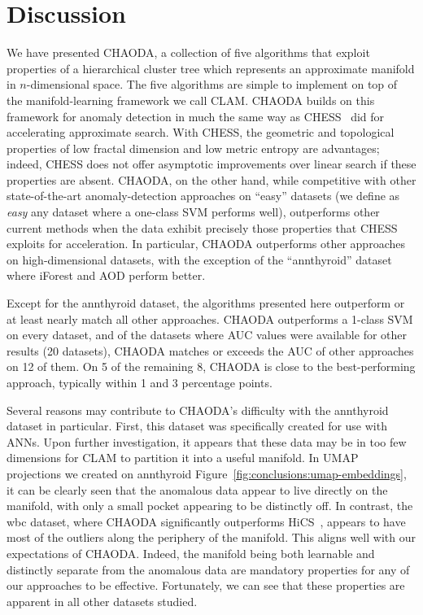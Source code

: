 \section{Discussion}
\label{sec:conclusions}

We have presented CHAODA, a collection of five algorithms that exploit properties of a hierarchical cluster tree which represents an approximate manifold in $n$-dimensional space.
The five algorithms are simple to implement on top of the manifold-learning framework we call CLAM\@.
CHAODA builds on this framework for anomaly detection in much the same way as CHESS~\cite{ishaq2019entropy} did for accelerating approximate search.
With CHESS, the geometric and topological properties of low fractal dimension and low metric entropy are advantages;
indeed, CHESS does not offer asymptotic improvements over linear search if these properties are absent.
CHAODA, on the other hand, while competitive with other state-of-the-art anomaly-detection approaches on ``easy'' datasets (we define as \textit{easy} any dataset where a one-class SVM performs well), outperforms other current methods when the data exhibit precisely those properties that CHESS exploits for acceleration.
In particular, CHAODA outperforms other approaches on high-dimensional datasets, with the exception of the ``annthyroid'' dataset where iForest and AOD perform better.

Except for the annthyroid dataset, the algorithms presented here outperform or at least nearly match all other approaches.
CHAODA outperforms a 1-class SVM on every dataset, and of the datasets where AUC values were available for other results (20 datasets), CHAODA matches or exceeds the AUC of other approaches on 12 of them.
On 5 of the remaining 8, CHAODA is close to the best-performing approach, typically within 1 and 3 percentage points.

Several reasons may contribute to CHAODA's difficulty with the annthyroid dataset in particular.
First, this dataset was specifically created for use with ANNs.
Upon further investigation, it appears that these data may be in too few dimensions for CLAM to partition it into a useful manifold.
In UMAP~\cite{mcinnes2018umap} projections we created on annthyroid Figure~\ref{fig:conclusions:umap-embeddings}, it can be clearly seen that the anomalous data appear to live directly on the manifold, with only a small pocket appearing to be distinctly off.
In contrast, the wbc dataset, where CHAODA significantly outperforms HiCS~\cite{keller2012hics}, appears to have most of the outliers along the periphery of the manifold.
This aligns well with our expectations of CHAODA\@.
Indeed, the manifold being both learnable and distinctly separate from the anomalous data are mandatory properties for any of our approaches to be effective.
Fortunately, we can see that these properties are apparent in all other datasets studied.

